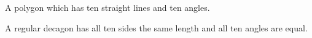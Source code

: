 A polygon which has ten straight lines and ten angles.
\par
A regular decagon has all ten sides the same length and all ten angles are equal.